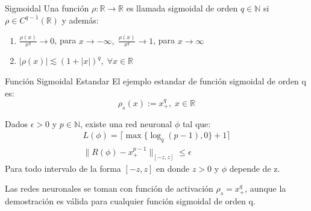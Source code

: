 \documentclass[12pt,a4paper]{book}
\providecommand{\abs}[1]{\lvert#1\rvert}
\providecommand{\norm}[1]{\lVert#1\rVert}
\providecommand{\conj}[1]{\lbrace#1\rbrace}
\begin{document}
\smallskip
\begin{definicion}{Sigmoidal}{}
Una función $\rho :\mathbb{R}\rightarrow\mathbb{R}$ es llamada sigmoidal de orden $q\in\mathbb{N}$ si $\rho\in C^{q-1}(\mathbb{R})$ y además:
\begin{enumerate}
\item $\frac{\rho (x)}{x^{q}}\rightarrow 0$, para $x\rightarrow -\infty,\; \frac{\rho (x)}{x^{q}}\rightarrow 1$, para $x\rightarrow \infty$
\item $\abs{\rho (x)}\lesssim (1+\abs{x})^{q},\;\forall x\in\mathbb{R}$
\end{enumerate}
\end{definicion}
\smallskip
\begin{definicion}{Función Sigmoidal Estandar}{}
El ejemplo estandar de función sigmoidal de orden q es:
$$\rho_{s}(x):=x_{+}^{q},\; x\in\mathbb{R}$$
\end{definicion}
\smallskip
\begin{lema}{}{}
Dados $\epsilon >0$ y $p\in\mathbb{N}$, existe una red neuronal $\phi$ tal que: 
\begin{equation*}
\begin{split}
L(\phi)=\lceil \max\conj{\log_{q}(p-1),0}+1 \rceil\\
\norm{R(\phi)-x_{+}^{p-1}}_{[-z,z]}\leq \epsilon
\end{split}
\end{equation*}
Para todo intervalo de la forma $[-z,z]$ en donde $z > 0$ y $\phi$ depende de z.
\end{lema}
Las redes neuronales se toman con función de activación $\rho_{s}=x_{+}^{q}$, aunque la demostración es válida para cualquier función sigmoidal de orden q.
\end{document}
